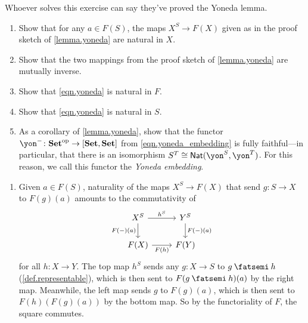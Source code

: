 \documentclass[Book-Poly]{subfiles}
\begin{document}
\begin{exercise}\label{exc.finish_proof_yoneda}
Whoever solves this exercise can say they've proved the Yoneda lemma.
\begin{enumerate}
	\item Show that for any $a\in F(S)$, the maps $X^S\to F(X)$ given as in the proof sketch of \cref{lemma.yoneda} are natural in $X$.
	\item Show that the two mappings from the proof sketch of \cref{lemma.yoneda} are mutually inverse.
	\item Show that \eqref{eqn.yoneda} is natural in $F$.
	\item Show that \eqref{eqn.yoneda} is natural in $S$.
	\item As a corollary of \cref{lemma.yoneda}, show that the functor $\yon^-\colon\smset\op\to[\smset,\smset]$ from \eqref{eqn.yoneda_embedding} is fully faithful---in particular, that there is an isomorphism $S^T\iso \nat(\yon^S,\yon^T)$.
	For this reason, we call this functor the \emph{Yoneda embedding}.
\qedhere
\end{enumerate}

\begin{solution}
\begin{enumerate}
    \item Given $a \in F(S)$, naturality of the maps $X^S \to F(X)$ that send $g \colon S \to X$ to $F(g)(a)$ amounts to the commutativity of
    \[
    \begin{tikzcd}[ampersand replacement=\&]
    	X^S\ar[r, "h^S"]\ar[d, "F(-)(a)"']\&
    	Y^S\ar[d, "F(-)(a)"]\\
    	F(X)\ar[r, "F(h)"']\&
    	F(Y)
    \end{tikzcd}
    \]
    for all $h \colon X \to Y$.
    The top map $h^S$ sends any $g \colon X \to S$ to $g \then h$ (\cref{def.representable}), which is then sent to $F(g \then h)(a)$ by the right map.
    Meanwhile, the left map sends $g$ to $F(g)(a)$, which is then sent to $F(h)(F(g)(a))$ by the bottom map.
    So by the functoriality of $F$, the square commutes.
    

\end{enumerate}
\end{solution}
\end{exercise}
\end{document}

